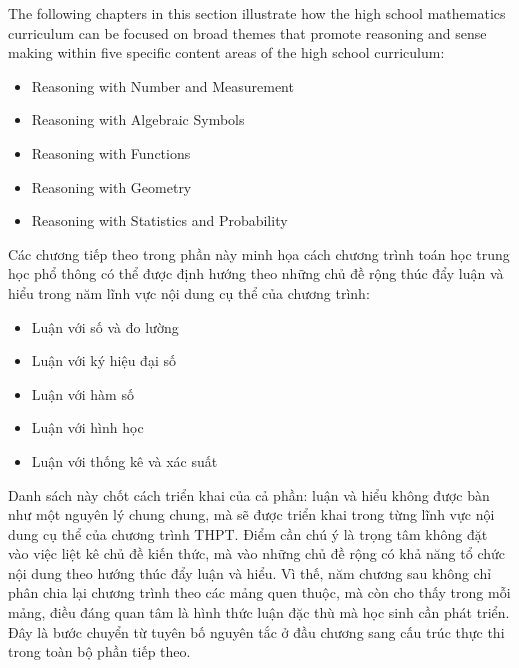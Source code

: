 \documentclass[
  10pt,
  a4paper,
  landscape,
  twoside,
  openany
]{scrbook}
\newcommand{\EN}[1]{#1}
\newcommand{\VI}[1]{#1}
\newcommand{\NOTE}[1]{#1}
\begin{document}
\TriPara
{
\EN{The following chapters in this section illustrate how the high school mathematics curriculum can be focused on broad themes that promote reasoning and sense making within five specific content areas of the high school curriculum:

\begin{itemize}
  \item Reasoning with Number and Measurement
  \item Reasoning with Algebraic Symbols
  \item Reasoning with Functions
  \item Reasoning with Geometry
  \item Reasoning with Statistics and Probability
\end{itemize}}
}
{
\VI{Các chương tiếp theo trong phần này minh họa cách chương trình toán học trung học phổ thông có thể được định hướng theo những chủ đề rộng thúc đẩy luận và hiểu trong năm lĩnh vực nội dung cụ thể của chương trình:

\begin{itemize}
  \item Luận với số và đo lường
  \item Luận với ký hiệu đại số
  \item Luận với hàm số
  \item Luận với hình học
  \item Luận với thống kê và xác suất
\end{itemize}}
}
{
\NOTE{Danh sách này chốt cách triển khai của cả phần: luận và hiểu không được bàn như một nguyên lý chung chung, mà sẽ được triển khai trong từng lĩnh vực nội dung cụ thể của chương trình THPT. Điểm cần chú ý là trọng tâm không đặt vào việc liệt kê chủ đề kiến thức, mà vào những chủ đề rộng có khả năng tổ chức nội dung theo hướng thúc đẩy luận và hiểu. Vì thế, năm chương sau không chỉ phân chia lại chương trình theo các mảng quen thuộc, mà còn cho thấy trong mỗi mảng, điều đáng quan tâm là hình thức luận đặc thù mà học sinh cần phát triển. Đây là bước chuyển từ tuyên bố nguyên tắc ở đầu chương sang cấu trúc thực thi trong toàn bộ phần tiếp theo.}
}
\end{document}
